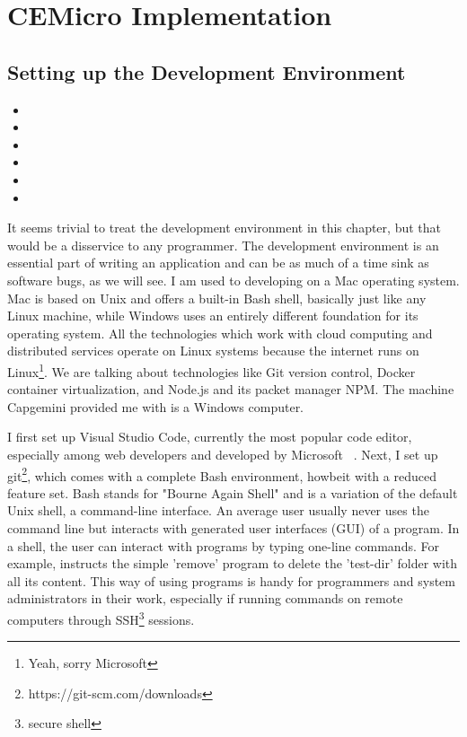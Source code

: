 \chapter{CEMicro Implementation}
\label{sec:impl}


\section{Setting up the Development Environment}

\begin{itemize}
  \item {}
  \item {}
  \item {}
  \item {}
  \item {}
  \item {}
\end{itemize}

It seems trivial to treat the development environment in this chapter, but that would be a disservice to any programmer. The development environment is an essential part of writing an application and can be as much of a time sink as software bugs, as we will see. I am used to developing on a Mac operating system. Mac is based on Unix and offers a built-in Bash shell, basically just like any Linux machine, while Windows uses an entirely different foundation for its operating system. All the technologies which work with cloud computing and distributed services operate on Linux systems because the internet runs on Linux\footnote{Yeah, sorry Microsoft}. We are talking about technologies like Git version control, Docker container virtualization, and Node.js and its packet manager NPM. The machine Capgemini provided me with is a Windows computer.

I first set up Visual Studio Code, currently the most popular code editor, especially among web developers and developed by Microsoft ~\cite{stackoverflow.2019}. Next, I set up git\footnote{https://git-scm.com/downloads}, which comes with a complete Bash environment, howbeit with a reduced feature set. Bash stands for "Bourne Again Shell" and is a variation of the default Unix shell, a command-line interface. An average user usually never uses the command line but interacts with generated user interfaces (GUI) of a program. In a shell, the user can interact with programs by typing one-line commands. For example,  instructs the simple 'remove' program to delete the 'test-dir' folder with all its content. This way of using programs is handy for programmers and system administrators in their work, especially if running commands on remote computers through SSH\footnote{secure shell} sessions.

